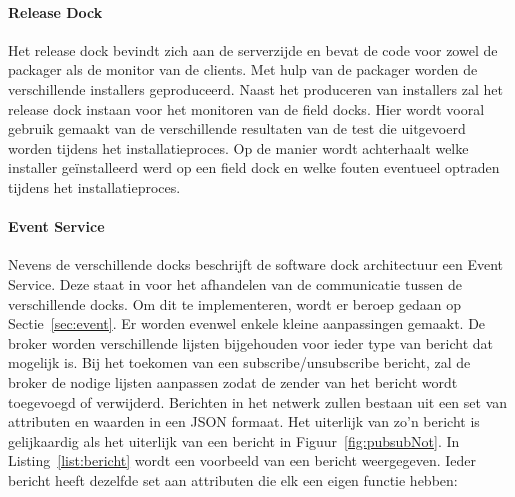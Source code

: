 \paragraph{Release Dock}
Het release dock bevindt zich aan de serverzijde en bevat de code voor zowel de packager als de monitor van de clients.
Met hulp van de packager worden de verschillende installers geproduceerd.
Naast het produceren van installers zal het release dock instaan voor het monitoren van de field docks.
Hier wordt vooral gebruik gemaakt van de verschillende resultaten van de test die uitgevoerd worden tijdens het installatieproces.
Op de manier wordt achterhaalt welke installer geïnstalleerd werd op een field dock en welke fouten eventueel optraden tijdens het installatieproces.

\paragraph{Event Service}
Nevens de verschillende docks beschrijft de software dock architectuur een Event Service.
Deze staat in voor het afhandelen van de communicatie tussen de verschillende docks.
Om dit te implementeren, wordt er beroep gedaan op Sectie~\vref{sec:event}.
Er worden evenwel enkele kleine aanpassingen gemaakt.
De broker worden verschillende lijsten bijgehouden voor ieder type van bericht dat mogelijk is.
Bij het toekomen van een subscribe/unsubscribe bericht, zal de broker de nodige lijsten aanpassen zodat de zender van het bericht wordt toegevoegd of verwijderd.
Berichten in het netwerk zullen bestaan uit een set van attributen en waarden in een JSON formaat.
Het uiterlijk van zo'n bericht is gelijkaardig als het uiterlijk van een bericht in Figuur~\vref{fig:pubsubNot}.
In Listing~\vref{list:bericht} wordt een voorbeeld van een bericht weergegeven.
Ieder bericht heeft dezelfde set aan attributen die elk een eigen functie hebben:
